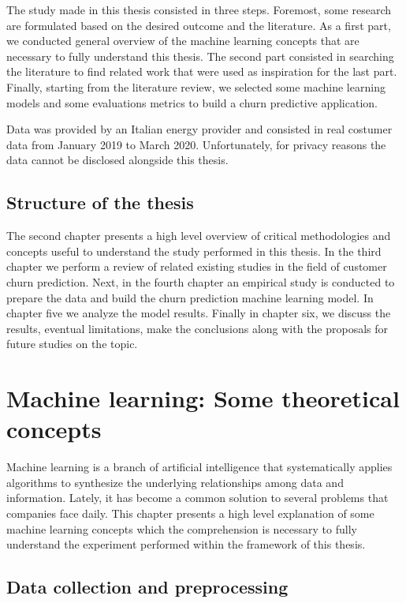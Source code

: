 \documentclass[LaM,binding=0.6cm, english]{sapthesis}
\begin{document}
The study made in this thesis consisted in three steps. Foremost, some research are formulated based on the desired outcome and the literature. As a first part, we conducted general overview of the machine learning concepts that are necessary to fully understand this thesis. The second part consisted in searching the literature to find related work that were used as inspiration for the last part. Finally, starting from the literature review, we selected some machine learning models and some evaluations metrics to build a churn predictive application.

Data was provided by an Italian energy provider and consisted in real costumer data from January 2019 to March 2020. Unfortunately, for privacy reasons the data cannot be disclosed alongside this thesis.

\section{Structure of the thesis}

The second chapter presents a high level overview of critical methodologies and concepts useful to understand the study performed in this thesis. In the third chapter we perform a review of related existing studies in the field of customer churn prediction. Next, in the fourth chapter an empirical study is conducted to prepare the data and build the churn prediction machine learning model. In chapter five we analyze the model results. Finally in chapter six, we discuss the results, eventual limitations, make the conclusions along with the proposals for future studies on the topic.

\chapter{Machine learning: Some theoretical concepts}

Machine learning is a branch of artificial intelligence that systematically applies algorithms to synthesize the underlying relationships among data and information.\cite{Awad2015} Lately, it has become a common solution to several problems that companies face daily. This chapter presents a high level explanation of some machine learning concepts which the comprehension is necessary to fully understand the experiment performed within the framework of this thesis.

\section{Data collection and preprocessing} \label{data-collection}
\end{document}
